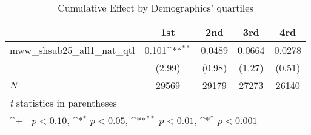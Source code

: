 \begin{table}[htbp]\centering
\def\sym#1{\ifmmode^{#1}\else\(^{#1}\)\fi}
\caption{Cumulative Effect by Demographics' quartiles}
\begin{tabular}{l*{4}{c}}
\hline\hline
            &\multicolumn{1}{c}{1st}&\multicolumn{1}{c}{2nd}&\multicolumn{1}{c}{3rd}&\multicolumn{1}{c}{4rd}\\
\hline
mww\_shsub25\_all1\_nat\_qtl&      0.101\sym{**}&      0.0489       &      0.0664       &      0.0278       \\
            &      (2.99)       &      (0.98)       &      (1.27)       &      (0.51)       \\
\hline
\(N\)       &       29569       &       29179       &       27273       &       26140       \\
\hline\hline
\multicolumn{5}{l}{\footnotesize \textit{t} statistics in parentheses}\\
\multicolumn{5}{l}{\footnotesize \sym{+} \(p<0.10\), \sym{*} \(p<0.05\), \sym{**} \(p<0.01\), \sym{*} \(p<0.001\)}\\
\end{tabular}
\end{table}
